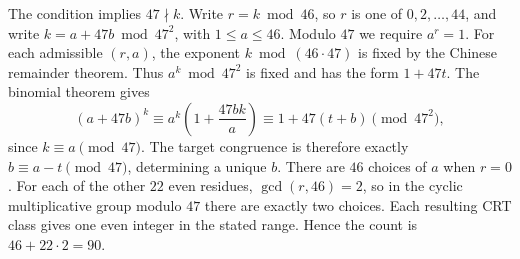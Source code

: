 The condition implies $47\nmid k$. Write $r=k\bmod46$, so $r$ is one of $0,2,\ldots,44$, and write $k=a+47b\bmod47^2$, with $1\le a\le46$. Modulo $47$ we require $a^r=1$.
For each admissible $(r,a)$, the exponent $k\bmod(46\cdot47)$ is fixed by the Chinese remainder theorem. Thus $a^k\bmod47^2$ is fixed and has the form $1+47t$. The binomial theorem gives
\[
(a+47b)^k\equiv a^k(1+\dfrac{47bk}{a})\equiv1+47(t+b)\pmod{47^2},
\]
since $k\equiv a\pmod{47}$. The target congruence is therefore exactly $b\equiv a-t\pmod{47}$, determining a unique $b$.
There are $46$ choices of $a$ when $r=0$. For each of the other $22$ even residues, $\gcd(r,46)=2$, so in the cyclic multiplicative group modulo $47$ there are exactly two choices. Each resulting CRT class gives one even integer in the stated range. Hence the count is $\boxed{46+22\cdot2=90}$.

